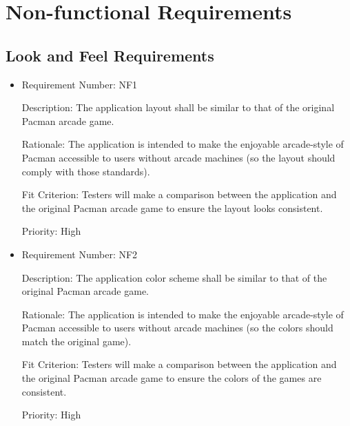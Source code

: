 \documentclass[12pt, titlepage]{article}
\begin{document}
\section{Non-functional Requirements}

\subsection{Look and Feel Requirements}
\begin{itemize}
	\item
	Requirement Number: \hypertarget{nf1}{NF1}

	Description: The application layout shall be similar to that of the original Pacman arcade game.

	Rationale: The application is intended to make the enjoyable arcade-style of Pacman accessible to users without arcade machines (so the layout should comply with those standards).

	Fit Criterion: Testers will make a comparison between the application and the original Pacman arcade game to ensure the layout looks consistent.

	Priority: High

	\item
	Requirement Number: \hypertarget{nf2}{NF2}

	Description: The application color scheme shall be similar to that of the original Pacman arcade game.

	Rationale: The application is intended to make the enjoyable arcade-style of Pacman accessible to users without arcade machines (so the colors should match the original game).

	Fit Criterion: Testers will make a comparison between the application and the original Pacman arcade game to ensure the colors of the games are consistent.

	Priority: High
\end{itemize}
\end{document}
